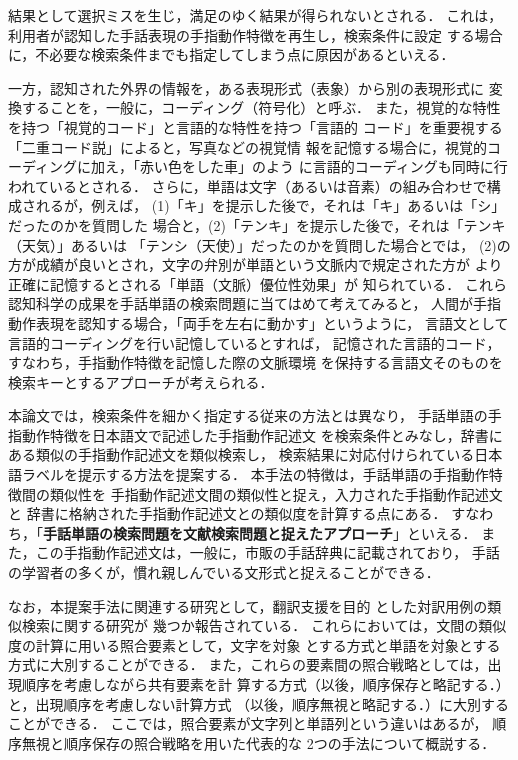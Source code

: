 \noindent 結果として選択ミスを生じ，満足のゆく結果が得られないとされる．
これは，利用者が認知した手話表現の手指動作特徴を再生し，検索条件に設定
する場合に，不必要な検索条件までも指定してしまう点に原因があるといえる．

一方，認知された外界の情報を，ある表現形式（表象）から別の表現形式に
変換することを，一般に，コーディング（符号化）と呼ぶ．
また，視覚的な特性を持つ「視覚的コード」と言語的な特性を持つ「言語的
コード」を重要視する「二重コード説」によると，写真などの視覚情
報を記憶する場合に，視覚的コーディングに加え，「赤い色をした車」のよう
に言語的コーディングも同時に行われているとされる\cite{Ohsima1986}．
さらに，単語は文字（あるいは音素）の組み合わせで構成されるが，例えば，
(1)「キ」を提示した後で，それは「キ」あるいは「シ」だったのかを質問した
場合と，(2)「テンキ」を提示した後で，それは「テンキ（天気）」あるいは
「テンシ（天使）」だったのかを質問した場合とでは，
(2)の方が成績が良いとされ，文字の弁別が単語という文脈内で規定された方が
より正確に記憶するとされる「単語（文脈）優位性効果\cite{Reicher1969}」が
知られている．
これら認知科学の成果を手話単語の検索問題に当てはめて考えてみると，
人間が手指動作表現を認知する場合，「両手を左右に動かす」というように，
言語文として言語的コーディングを行い記憶しているとすれば，
記憶された言語的コード，すなわち，手指動作特徴を記憶した際の文脈環境
を保持する言語文そのものを検索キーとするアプローチが考えられる．

本論文では，検索条件を細かく指定する従来の方法とは異なり，
手話単語の手指動作特徴を日本語文で記述した手指動作記述文
を検索条件とみなし，辞書にある類似の手指動作記述文を類似検索し，
検索結果に対応付けられている日本語ラベルを提示する方法を提案する．
本手法の特徴は，手話単語の手指動作特徴間の類似性を
手指動作記述文間の類似性と捉え，入力された手指動作記述文と
辞書に格納された手指動作記述文との類似度を計算する点にある．
すなわち，「{\bf 手話単語の検索問題を文献検索問題と捉えたアプローチ}」といえる．
また，この手指動作記述文は，一般に，市販の手話辞典に記載されており，
手話の学習者の多くが，慣れ親しんでいる文形式と捉えることができる．

なお，本提案手法に関連する研究として，翻訳支援を目的
とした対訳用例の類似検索に関する研究が
幾つか報告されている\cite[など]{NakamuraNaoto1989,SumitaEiichiro1991,SatoSatoshi1993,TanakaHideki1999}．
これらにおいては，文間の類似度の計算に用いる照合要素として，文字を対象
とする方式と単語を対象とする方式に大別することができる．
また，これらの要素間の照合戦略としては，出現順序を考慮しながら共有要素を計
算する方式（以後，順序保存と略記する．）と，出現順序を考慮しない計算方式
（以後，順序無視と略記する．）に大別することができる．
ここでは，照合要素が文字列と単語列という違いはあるが，
順序無視と順序保存の照合戦略を用いた代表的な 2つの手法について概説する．

